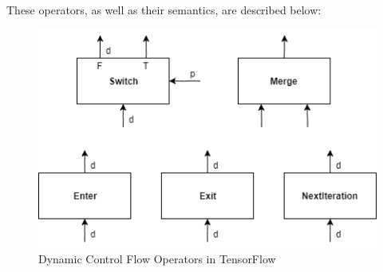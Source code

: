 \documentclass[ack,preface]{dithesis}
\begin{document}
These operators, as well as their semantics, are described below:

\begin{figure}
\centering
\includegraphics[scale=0.75]{figures/TFoperators}
\caption{ Dynamic Control Flow Operators in TensorFlow}
\end{figure}
\end{document}
